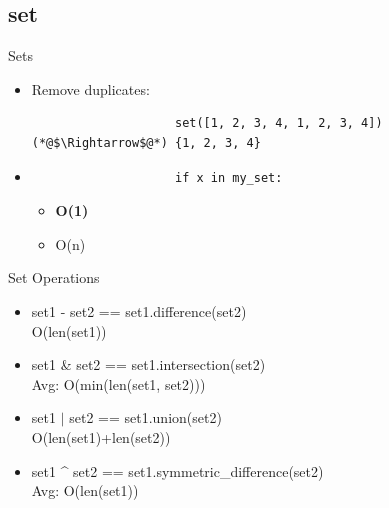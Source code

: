 \documentclass[11pt]{beamer}
\begin{document}
	\subsection{set}
		\begin{frame}[fragile]{Sets}
			\begin{itemize}
				\item<1-> Remove duplicates:
				\begin{lstlisting}
					set([1, 2, 3, 4, 1, 2, 3, 4]) (*@$\Rightarrow$@*) {1, 2, 3, 4}
				\end{lstlisting}
				
				\item<2->
				\begin{lstlisting}
					if x in my_set:
				\end{lstlisting}
				\begin{itemize}
					\item<2->[Avg:] \textbf{O(1)}
					\item<2->[Worst:] O(n)
				\end{itemize}
			\end{itemize}
		\end{frame}
		
		\begin{frame}[fragile]{Set Operations}
			\begin{itemize}
				\item set1 - set2 == set1.difference(set2) \\ O(len(set1))
				\pause
					
				\item set1 \& set2 == set1.intersection(set2) \\ Avg: O(min(len(set1, set2)))
				\pause				
								
				\item set1 $|$ set2  == set1.union(set2) \\ O(len(set1)+len(set2))
				\pause
						
				\item set1 \^{} set2 == set1.symmetric\_difference(set2) \\ Avg: O(len(set1))
			\end{itemize}
		\end{frame}
		
\end{document}
